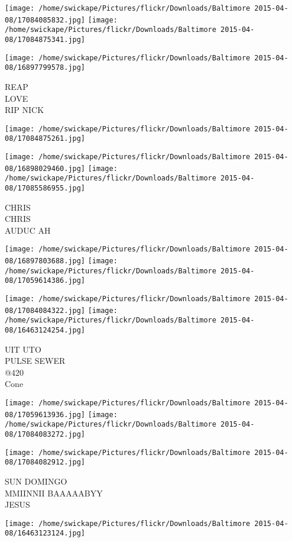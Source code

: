 \documentclass[10pt,letterpaper]{article}
\begin{document}
\texttt{[image: /home/swickape/Pictures/flickr/Downloads/Baltimore 2015-04-08/17084085832.jpg]}
\texttt{[image: /home/swickape/Pictures/flickr/Downloads/Baltimore 2015-04-08/17084875341.jpg]}

\texttt{[image: /home/swickape/Pictures/flickr/Downloads/Baltimore 2015-04-08/16897799578.jpg]}

REAP\\
LOVE\\
RIP NICK
\pagebreak

\texttt{[image: /home/swickape/Pictures/flickr/Downloads/Baltimore 2015-04-08/17084875261.jpg]}

\vspace{0.25in}
\texttt{[image: /home/swickape/Pictures/flickr/Downloads/Baltimore 2015-04-08/16898029460.jpg]}
\texttt{[image: /home/swickape/Pictures/flickr/Downloads/Baltimore 2015-04-08/17085586955.jpg]}

CHRIS\\
CHRIS\\
AUDUC AH
\pagebreak

\texttt{[image: /home/swickape/Pictures/flickr/Downloads/Baltimore 2015-04-08/16897803688.jpg]}
\texttt{[image: /home/swickape/Pictures/flickr/Downloads/Baltimore 2015-04-08/17059614386.jpg]}

\texttt{[image: /home/swickape/Pictures/flickr/Downloads/Baltimore 2015-04-08/17084084322.jpg]}
\texttt{[image: /home/swickape/Pictures/flickr/Downloads/Baltimore 2015-04-08/16463124254.jpg]}

UIT UTO\\
PULSE SEWER\\
@420\\
Cone
\pagebreak

\texttt{[image: /home/swickape/Pictures/flickr/Downloads/Baltimore 2015-04-08/17059613936.jpg]}
\texttt{[image: /home/swickape/Pictures/flickr/Downloads/Baltimore 2015-04-08/17084083272.jpg]}

\vspace{0.25in}
\texttt{[image: /home/swickape/Pictures/flickr/Downloads/Baltimore 2015-04-08/17084082912.jpg]}

SUN DOMINGO\\
MMIINNII BAAAAABYY\\
JESUS
\pagebreak

\texttt{[image: /home/swickape/Pictures/flickr/Downloads/Baltimore 2015-04-08/16463123124.jpg]}
\end{document}
